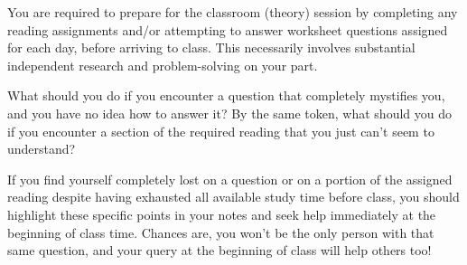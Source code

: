 

You are required to prepare for the classroom (theory) session by completing any reading assignments and/or attempting to answer worksheet questions assigned for each day, before arriving to class.  This necessarily involves substantial independent research and problem-solving on your part.

What should you do if you encounter a question that completely mystifies you, and you have no idea how to answer it?  By the same token, what should you do if you encounter a section of the required reading that you just can't seem to understand? 







If you find yourself completely lost on a question or on a portion of the assigned reading despite having exhausted all available study time before class, you should highlight these specific points in your notes and seek help immediately at the beginning of class time.  Chances are, you won't be the only person with that same question, and your query at the beginning of class will help others too!











